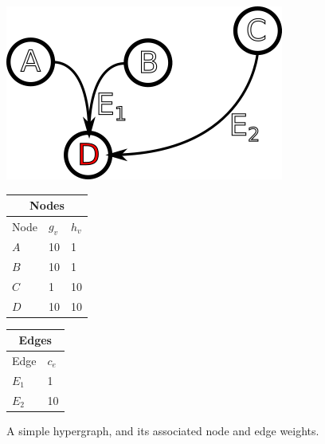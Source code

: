 \documentclass[12pt,twoside]{reedthesis}
\theoremstyle{definition}
\begin{document}
\begin{figure}[th]
  \begin{minipage}[b]{0.30\linewidth}
    \centering
    \includegraphics[width=\linewidth]{dummy-before}
    \par\vspace{0pt}
  \end{minipage}%
  \begin{minipage}[b]{0.30\linewidth}
    \centering%
    \begin{tabular}{ |l|l|l| }%
      \hline%
      \multicolumn{3}{|c|}{Nodes} \\%
      \hline \hline
      Node & $g_v$ &  $h_v$ \\ \hline%
      $A$ & 10 &  1\\ \hline%
      $B$ & 10 &  1\\ \hline%
      $C$ & 1 &  10\\ \hline%
      $D$ & 10 &  10\\ \hline%
    \end{tabular}%
    \par\vspace{0pt}
  \end{minipage}
  \begin{minipage}[b]{0.30\linewidth}
    \centering%
    \begin{tabular}{ |l|l| }%
      \hline%
      \multicolumn{2}{|c|}{Edges} \\%
      \hline \hline
      Edge & $c_e$ \\ \hline%
      $E_1$ & 1 \\ \hline%
      $E_2$ & 10 \\ \hline%
    \end{tabular}%
    \par\vspace{0pt}
  \end{minipage}
\caption[A small hypergraph, with node and edge data]{A simple hypergraph, and its associated node and edge weights.}
\label{fig:dummy-before}
\end{figure}
\end{document}
